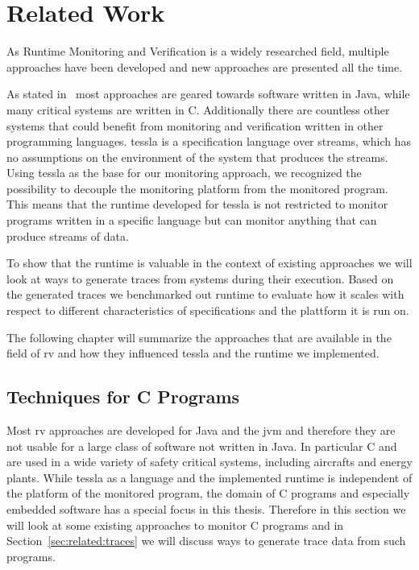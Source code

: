 %
\chapter{Related Work}
\label{sec:related}

As Runtime Monitoring and Verification is a widely researched field, multiple approaches have been developed and new approaches are presented all the time.

As stated in~\cite{Havelund2008} most approaches are geared towards software written in Java, while many critical systems are written in C.
Additionally there are countless other systems that could benefit from monitoring and verification written in other programming languages.
\Gls{tessla} is a specification language over streams, which has no assumptions on the environment of the system that produces the streams.
Using \gls{tessla}  as the base for our monitoring approach, we recognized the possibility to decouple the monitoring platform from the monitored program.
This means that the runtime developed for \gls{tessla} is not restricted to monitor programs written in a specific language but can monitor anything that can produce streams of data.

To show that the runtime is valuable in the context of existing approaches we will look at ways to generate traces from systems during their execution.
Based on the generated traces we benchmarked out runtime to evaluate how it scales with respect to different characteristics of specifications and the plattform it is run on.

The following chapter will summarize the approaches that are available in the field of \gls{rv} and how they influenced \gls{tessla} and the runtime we implemented.

\section{ Techniques for C Programs}
\label{sec:related:c_programs}

Most \gls{rv} approaches are developed for Java and the \gls{jvm} and therefore they are not usable for a large class of software not written in Java.
In particular C and \CC are used in a wide variety of safety critical systems, including aircrafts and energy plants.
While \gls{tessla} as a language and the implemented runtime is independent of the platform of the monitored program, the domain of C programs and especially embedded software has a special focus in this thesis.
Therefore in this section we will look at some existing approaches to monitor C programs and in Section~\ref{sec:related:traces} we will discuss ways to generate trace data from such programs.

